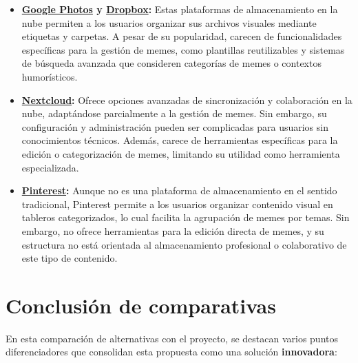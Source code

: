 \begin{itemize}
  \item \textbf{\href{https://www.google.com/intl/es_es/photos/about/}{Google Photos} y \href{https://www.dropbox.com/}{Dropbox}:} Estas plataformas de almacenamiento en la nube permiten a los usuarios organizar sus archivos visuales mediante etiquetas y carpetas. A pesar de su popularidad, carecen de funcionalidades específicas para la gestión de memes, como plantillas reutilizables y sistemas de búsqueda avanzada que consideren categorías de memes o contextos humorísticos.
  \item \textbf{\href{https://nextcloud.com/es/}{Nextcloud}:} Ofrece opciones avanzadas de sincronización y colaboración en la nube, adaptándose parcialmente a la gestión de memes. Sin embargo, su configuración y administración pueden ser complicadas para usuarios sin conocimientos técnicos. Además, carece de herramientas específicas para la edición o categorización de memes, limitando su utilidad como herramienta especializada.
  \item \textbf{\href{https://es.pinterest.com/}{Pinterest}:} Aunque no es una plataforma de almacenamiento en el sentido tradicional, Pinterest permite a los usuarios organizar contenido visual en tableros categorizados, lo cual facilita la agrupación de memes por temas. Sin embargo, no ofrece herramientas para la edición directa de memes, y su estructura no está orientada al almacenamiento profesional o colaborativo de este tipo de contenido.
\end{itemize}

\section{Conclusión de comparativas}

En esta comparación de alternativas con el proyecto, se destacan varios puntos diferenciadores que consolidan esta propuesta como una solución \textbf{innovadora}:

